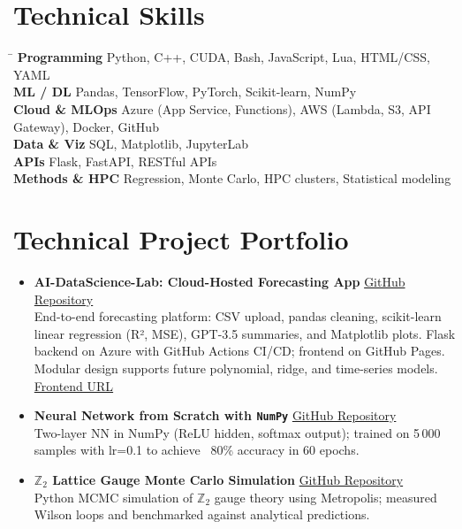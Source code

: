 \documentclass[11pt]{article}
\begin{document}
\section*{Technical Skills}
\vspace{-0.3em}
\begin{tabbing}
\hspace{3.5cm} \= \kill
\textbf{Programming} \> Python, C++, CUDA, Bash, JavaScript, Lua, HTML/CSS, YAML \\
\textbf{ML / DL} \> Pandas, TensorFlow, PyTorch, Scikit-learn, NumPy \\
\textbf{Cloud \& MLOps} \> Azure (App Service, Functions), AWS (Lambda, S3, API Gateway), Docker, GitHub\\
\textbf{Data \& Viz} \> SQL, Matplotlib, JupyterLab \\
\textbf{APIs} \> Flask, FastAPI, RESTful APIs \\
\textbf{Methods \& HPC} \> Regression, Monte Carlo, HPC clusters, Statistical modeling
\end{tabbing}

\section*{Technical Project Portfolio}
\vspace{-0.3em}
\begin{itemize}
    \item \textbf{AI-DataScience-Lab: Cloud-Hosted Forecasting App}  
    \hfill \href{https://github.com/Hariprashad-Ravikumar/AI-DataScience-Lab}{GitHub Repository} \\
    End-to-end forecasting platform: CSV upload, pandas cleaning, scikit-learn linear regression (R², MSE), GPT-3.5 summaries, and Matplotlib plots. Flask backend on Azure with GitHub Actions CI/CD; frontend on GitHub Pages. Modular design supports future polynomial, ridge, and time-series models.  
    \href{https://hariprashad-ravikumar.github.io/AI-DataScience-Lab}{Frontend URL}

    \item \textbf{Neural Network from Scratch with \texttt{NumPy}}  
    \hfill \href{https://github.com/Hariprashad-Ravikumar/Neural-Network-from-Scratch-with-NumPy}{GitHub Repository} \\
    Two-layer NN in NumPy (ReLU hidden, softmax output); trained on 5\,000 samples with lr=0.1 to achieve ~80\% accuracy in 60 epochs.  

    \item \textbf{$\mathbb{Z}_2$ Lattice Gauge Monte Carlo Simulation}  
    \hfill \href{https://github.com/Hariprashad-Ravikumar/Z2_LatticeGauge_Monte_Carlo_Simulation}{GitHub Repository} \\
    Python MCMC simulation of $\mathbb{Z}_2$ gauge theory using Metropolis; measured Wilson loops and benchmarked against analytical predictions.
\end{itemize}
\end{document}
